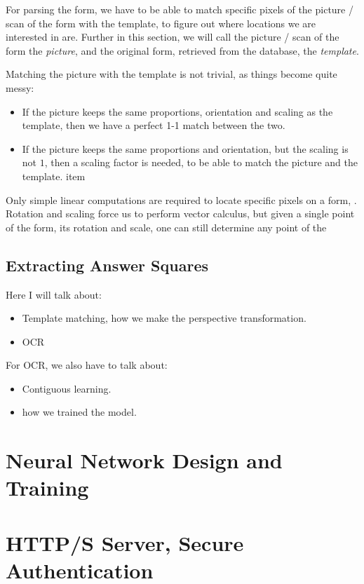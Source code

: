 \documentclass[12pt, a4paper]{report}
\begin{document}
For parsing the form, we have to be able to match specific pixels of the picture / scan of the form with the template, to figure out where locations we are interested in are. Further in this section, we will call the picture / scan of the form the \textit{picture}, and the original form, retrieved from the database, the \textit{template}.

Matching the picture with the template is not trivial, as things become quite messy:
\begin{itemize}
    \item If the picture keeps the same proportions, orientation and scaling as the template, then we have a perfect 1-1 match between the two.
    \item If the picture keeps the same proportions and orientation, but the scaling is not $1$, then a scaling factor is needed, to be able to match the picture and the template.
    item
\end{itemize}

Only simple linear computations are required to locate specific pixels on a form, . Rotation and scaling force us to perform vector calculus, but given a single point of the form, its rotation and scale, one can still determine any point of the 

\section{Extracting Answer Squares}


Here I will talk about:
\begin{itemize}
    \item Template matching, how we make the perspective transformation.
    \item OCR
\end{itemize}

For OCR, we also have to talk about:
\begin{itemize}
    \item Contiguous learning.
    \item how we trained the model.
\end{itemize}

\chapter{Neural Network Design and Training}

\chapter{HTTP/S Server, Secure Authentication}
\end{document}
